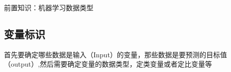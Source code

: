 前置知识：机器学习数据类型
\subsection{变量标识}
首先要确定哪些数据是输入（Input）的变量，那些数据是要预测的目标值（output）,然后需要确定变量的数据类型，定类变量或者定比变量等
